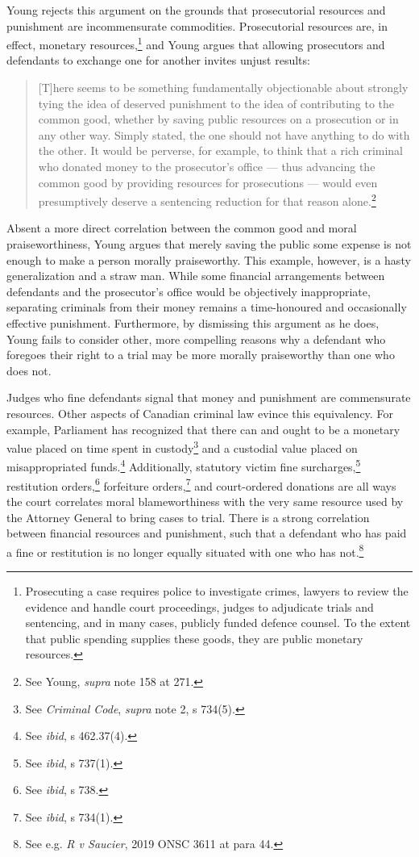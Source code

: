 Young rejects this argument on the grounds that prosecutorial resources and punishment are incommensurate commodities. Prosecutorial resources are, in effect, monetary resources,\footnote{Prosecuting a case requires police to investigate crimes, lawyers to review the evidence and handle court proceedings, judges to adjudicate trials and sentencing, and in many cases, publicly funded defence counsel. To the extent that public spending supplies these goods, they are public monetary resources.} and Young argues that allowing prosecutors and defendants to exchange one for another invites unjust results:

\begin{quote}
    \begin{singlespace}
    
    [T]here seems to be something fundamentally objectionable about strongly tying the idea of deserved punishment to the idea of contributing to the common good, whether by saving public resources on a prosecution or in any other way. Simply stated, the one should not have anything to do with the other. It would be perverse, for example, to think that a rich criminal who donated money to the prosecutor's office — thus advancing the common good by providing resources for prosecutions — would even presumptively deserve a sentencing reduction for that reason alone.\footnote{See Young, \textit{supra} note 158 at 271.}
    \end{singlespace}
\end{quote}
Absent a more direct correlation between the common good and moral praiseworthiness, Young argues that merely saving the public some expense is not enough to make a person morally praiseworthy. This example, however, is a hasty generalization and a straw man. While some financial arrangements between defendants and the prosecutor's office would be objectively inappropriate, separating criminals from their money remains a time-honoured and occasionally effective punishment. Furthermore, by dismissing this argument as he does, Young fails to consider other, more compelling reasons why a defendant who foregoes their right to a trial may be more morally praiseworthy than one who does not.

Judges who fine defendants signal that money and punishment are commensurate resources. Other aspects of Canadian criminal law evince this equivalency. For example, Parliament has recognized that there can and ought to be a monetary value placed on time spent in custody\footnote{See \textit{Criminal Code}, \textit{supra} note 2, s 734(5).} and a custodial value placed on misappropriated funds.\footnote{See \textit{ibid}, s 462.37(4).} Additionally, statutory victim fine surcharges,\footnote{See \textit{ibid}, s 737(1).} restitution orders,\footnote{See \textit{ibid}, s 738.} forfeiture orders,\footnote{See \textit{ibid}, s 734(1).} and court-ordered donations are all ways the court correlates moral blameworthiness with the very same resource used by the Attorney General to bring cases to trial. There is a strong correlation between financial resources and punishment, such that a defendant who has paid a fine or restitution is no longer equally situated with one who has not.\footnote{See e.g. \textit{R v Saucier}, 2019 ONSC 3611 at para 44.}

